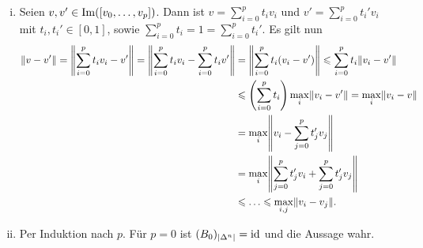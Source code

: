 \begin{enumerate}[(i)]
	\item Seien $v,v' \in \im \enbrace*{[v_0, \ldots ,v_p]}$. Dann ist $v = \sum_{i=0}^{p} t_i v_i$ und $v' = \sum_{i=0}^{p} t_i' v_i$ mit $t_i, t_i' \in [0,1]$, sowie
	$\sum_{i=0}^{p} t_i =1 = \sum_{i=0}^{p} t_i'$. Es gilt nun
	\begin{align*}
		\norm{v-v'} = \norm{\sum_{i=0}^{p} t_i v_i - v'} = \norm{\sum_{i=0}^{p} t_i v_i - \sum_{i=0}^{p} t_i v'} &= \norm{\sum_{i=0}^{p} t_i(v_i -v')}
		\le \sum_{i=0}^{p} t_i \norm{v_i -v'}   \\
		&\le \enbrace*{\sum_{i=0}^{p} t_i} \max_i \norm{v_i -v'} = \max_i \norm{v_i -v} \\
		&= \max_i \norm{v_i - \sum_{j=0}^{p} t'_j v_j} \\
		&= \max_i \norm{ \sum_{j=0}^{p} t'_j v_i + \sum_{j=0}^p t'_j v_j} \\ 
		&\le \ldots \le \max_{i,j} \norm{v_i - v_j}.   
	\end{align*}
	\item Per Induktion nach $p$. Für $p=0$ ist $(B_0)_{\lvert\Delta^n\rvert}=\operatorname{id}$ und die Aussage wahr.
	

\end{enumerate}
